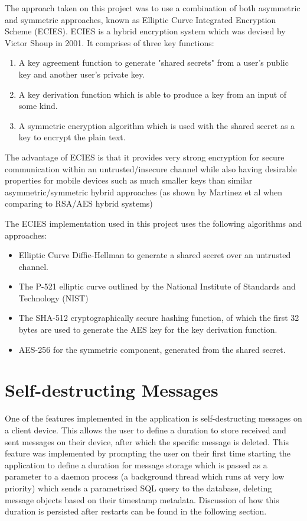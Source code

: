 \documentclass{mproj}
\begin{document}
The approach taken on this project was to use a combination of both asymmetric and symmetric approaches, known as Elliptic Curve Integrated Encryption Scheme (ECIES)\cite{martinez2010comparison}. ECIES is a hybrid encryption system which was devised by Victor Shoup in 2001. It comprises of three key functions:
\begin{enumerate}
	\item A key agreement function to generate "shared secrets" from a user's public key and another user's private key.
	\item A key derivation function which is able to produce a key from an input of some kind.
	\item A symmetric encryption algorithm which is used with the shared secret as a key to encrypt the plain text.
\end{enumerate}
The advantage of ECIES is that it provides very strong encryption for secure communication within an untrusted/insecure channel while also having desirable properties for mobile devices such as much smaller keys than similar asymmetric/symmetric hybrid approaches (as shown by Martinez et al when comparing to RSA/AES hybrid systems\cite{martinezECIES})

The ECIES implementation used in this project uses the following algorithms and approaches:
\begin{itemize}
	\item Elliptic Curve Diffie-Hellman\cite{maurer2000diffie} to generate a shared secret over an untrusted channel. 
	\item The P-521 elliptic curve outlined by the National Institute of Standards and Technology (NIST)\cite{brown2001software}
	\item The SHA-512 cryptographically secure hashing function, of which the first 32 bytes are used to generate the AES key for the key derivation function.
	\item AES-256 for the symmetric component, generated from the shared secret.
\end{itemize}

\section{Self-destructing Messages}
One of the features implemented in the application is self-destructing messages on a client device. This allows the user to define a duration to store received and sent messages on their device, after which the specific message is deleted. This feature was implemented by prompting the user on their first time starting the application to define a duration for message storage which is passed as a parameter to a daemon process (a background thread which runs at very low priority) which sends a parametrised SQL query to the database, deleting message objects based on their timestamp metadata. Discussion of how this duration is persisted after restarts can be found in the following section.
\end{document}
